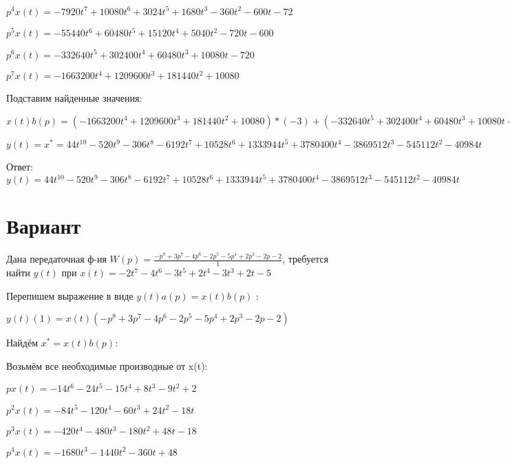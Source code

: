 \documentclass{article}
\begin{document}
{{{$p^4x(t)=-7920t^{7}+10080t^{6}+3024t^{5}+1680t^{3}-360t^{2}-600t-72$

$p^5x(t)=-55440t^{6}+60480t^{5}+15120t^{4}+5040t^{2}-720t-600$

$p^6x(t)=-332640t^{5}+302400t^{4}+60480t^{3}+10080t-720$

$p^7x(t)=-1663200t^{4}+1209600t^{3}+181440t^{2}+10080$

Подставим найденные значения:

$x(t)b(p) = (-1663200t^{4}+1209600t^{3}+181440t^{2}+10080)*(-3)+(-332640t^{5}+302400t^{4}+60480t^{3}+10080t-720)*(-4)+(-7920t^{7}+10080t^{6}+3024t^{5}+1680t^{3}-360t^{2}-600t-72)*1+(-990t^{8}+1440t^{7}+504t^{6}+420t^{4}-120t^{3}-300t^{2}-72t-6)*1+(-110t^{9}+180t^{8}+72t^{7}+84t^{5}-30t^{4}-100t^{3}-36t^{2}-6t-8)*4+(-11t^{10}+20t^{9}+9t^{8}+14t^{6}-6t^{5}-25t^{4}-12t^{3}-3t^{2}-8t+4)*1+(-11t^{10}+20t^{9}+9t^{8}+14t^{6}-6t^{5}-25t^{4}-12t^{3}-3t^{2}-8t+4)*(-5)=44t^{10}-520t^{9}-306t^{8}-6192t^{7}+10528t^{6}+1333944t^{5}+3780400t^{4}-3869512t^{3}-545112t^{2}-40984t$





$y(t)=x^*=44t^{10}-520t^{9}-306t^{8}-6192t^{7}+10528t^{6}+1333944t^{5}+3780400t^{4}-3869512t^{3}-545112t^{2}-40984t$

Ответ: $y(t) = 44t^{10}-520t^{9}-306t^{8}-6192t^{7}+10528t^{6}+1333944t^{5}+3780400t^{4}-3869512t^{3}-545112t^{2}-40984t$

\section{Вариант}

Дана передаточная ф-ия $W(p)=\frac{-p^{8}+3p^{7}-4p^{6}-2p^{5}-5p^{4}+2p^{3}-2p-2}{1}$, требуется найти $y(t)$ при $x(t)=-2t^{7}-4t^{6}-3t^{5}+2t^{4}-3t^{3}+2t-5$

Перепишем выражение в виде $y(t)a(p)=x(t)b(p)$ :

$y(t)(1)=x(t)(-p^{8}+3p^{7}-4p^{6}-2p^{5}-5p^{4}+2p^{3}-2p-2)$

Найдём $x^*=x(t)b(p)$:

Возьмём все необходимые производные от x(t):

$px(t)=-14t^{6}-24t^{5}-15t^{4}+8t^{3}-9t^{2}+2$

$p^2x(t)=-84t^{5}-120t^{4}-60t^{3}+24t^{2}-18t$

$p^3x(t)=-420t^{4}-480t^{3}-180t^{2}+48t-18$

$p^4x(t)=-1680t^{3}-1440t^{2}-360t+48$

}}}
\end{document}
